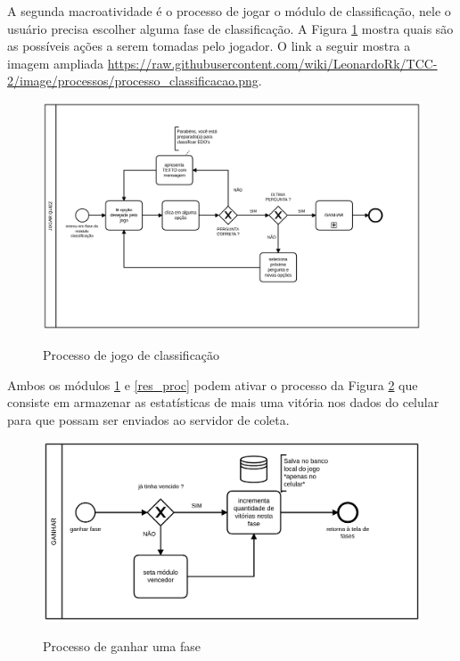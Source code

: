 A segunda macro\-atividade é o processo de jogar o módulo de classificação, nele o usuário precisa escolher alguma fase de classificação. A Figura \ref{class_proc} mostra quais são as possíveis ações a serem tomadas pelo jogador. O link a seguir mostra a imagem ampliada \url{https://raw.githubusercontent.com/wiki/LeonardoRk/TCC-2/image/processos/processo_classificacao.png}.  


\begin{figure}[H]
\centering
\caption{Processo de jogo de classificação}
\includegraphics[scale=0.15]{figuras/processos/processo_classificacao.png}
\label{class_proc}
\end{figure}

Ambos os módulos \ref{class_proc} e \ref{res_proc} podem ativar o processo da Figura \ref{ganhar_proc} que consiste em armazenar as estatísticas de mais uma vitória nos dados do celular para que possam ser enviados ao servidor de coleta.


\begin{figure}[H]
\centering
\caption{Processo de ganhar uma fase}
\includegraphics[scale=0.23]{figuras/processos/processo_ganhar.png}
\label{ganhar_proc}
\end{figure}

